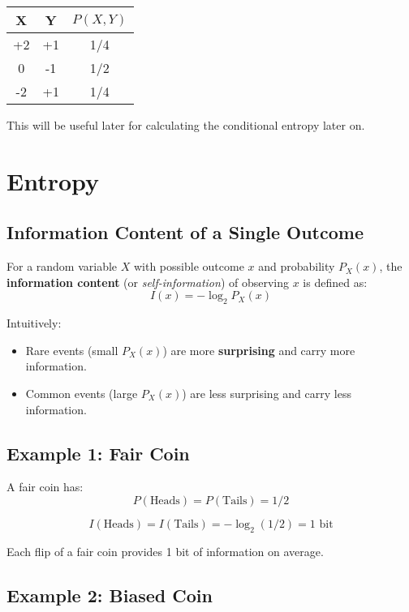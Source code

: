 \documentclass[11pt]{article}
\begin{document}
\begin{center}
\begin{tabular}{ccc}
\toprule
X & Y & $P(X,Y)$ \\
\midrule
+2 & +1 & 1/4 \\
0  & -1 & 1/2 \\
-2 & +1 & 1/4 \\
\bottomrule
\end{tabular}
\end{center}
This will be useful later for calculating the conditional entropy later on.

\newpage

\section*{Entropy}

\subsection*{Information Content of a Single Outcome}

For a random variable $X$ with possible outcome $x$ and probability $P_X(x)$, the \textbf{information content} (or \emph{self-information}) of observing $x$ is defined as:
\[
I(x) = - \log_2 P_X(x)
\]

Intuitively:
\begin{itemize}
    \item Rare events (small $P_X(x)$) are more \textbf{surprising} and carry more information.  
    \item Common events (large $P_X(x)$) are less surprising and carry less information.  
\end{itemize}

\subsection*{Example 1: Fair Coin}

A fair coin has:
\[
P(\text{Heads}) = P(\text{Tails}) = 1/2
\]

\[
I(\text{Heads}) = I(\text{Tails}) = - \log_2(1/2) = 1 \text{ bit}
\]

Each flip of a fair coin provides 1 bit of information on average.

\subsection*{Example 2: Biased Coin}
\end{document}
